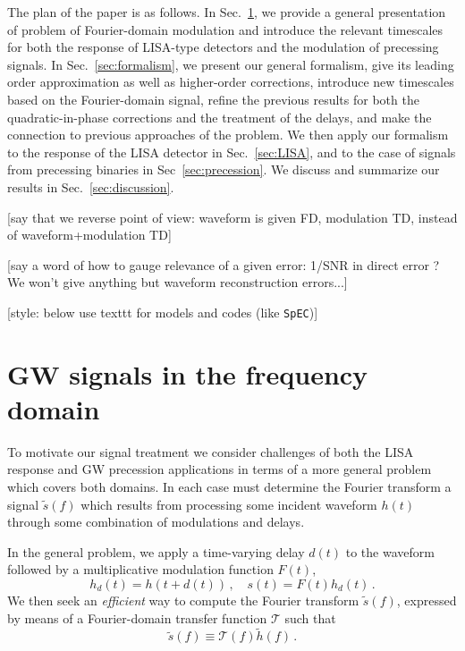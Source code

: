 \documentclass[aps,showpacs,twocolumn,
prd,superscriptaddress,nofootinbib]{revtex4-1}
\newcommand{\be}{\begin{equation}}
\newcommand{\ee}{\end{equation}}
\newcommand\calT{{\mathcal{T}}}
\newcommand{\SM}[1]{{\color{Red} #1}}
\newcommand{\jgb}[1]{{\color{DarkGreen} #1}}
\begin{document}
The plan of the paper is as follows. In Sec.~\ref{sec:motivation}, we provide a general presentation of problem of Fourier-domain modulation and introduce the relevant timescales for both the response of LISA-type detectors and the modulation of precessing signals. In Sec.~\ref{sec:formalism}, we present our general formalism, give its leading order approximation as well as higher-order corrections, introduce new timescales based on the Fourier-domain signal, refine the previous results for both the quadratic-in-phase corrections and the treatment of the delays, and make the connection to previous approaches of the problem. We then apply our formalism to the response of the LISA detector in Sec.~\ref{sec:LISA}, and to the case of signals from precessing binaries in Sec~\ref{sec:precession}. We discuss and summarize our results in Sec.~\ref{sec:discussion}.

\SM{[say that we reverse point of view: waveform is given FD, modulation TD, instead of waveform+modulation TD]}

\SM{[say a word of how to gauge relevance of a given error: 1/SNR in direct error ? We won't give anything but waveform reconstruction errors...]}

\SM{[style: below use texttt for models and codes (like \texttt{SpEC})]}


\section{GW signals in the frequency domain}
\label{sec:motivation}



\jgb{To motivate our signal treatment we consider challenges of both the LISA response and GW precession applications in terms of a more general problem which covers both domains. In each case must determine the Fourier transform a signal $\tilde s(f)$ which results from processing some incident waveform $h(t)$ through some combination of modulations and delays.}

In the general problem, we apply a time-varying delay $d(t)$ to the waveform followed by a multiplicative modulation function $F(t)$,
\be
\label{eq:delay-mod-defs}
	h_{d}(t) = h(t+d(t)) \,, \quad s(t) = F(t)h_{d}(t) \,.
\ee
We then seek an \textit{efficient} way to compute the Fourier transform $\tilde{s}(f)$, expressed by means of a Fourier-domain transfer function $\calT$ such that
\be\label{eq:deftransfer}
	\tilde{s}(f) \equiv \calT(f) \tilde{h}(f) \,. 
\ee
\end{document}

